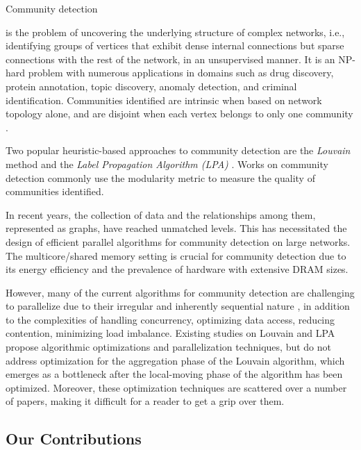 Community detection is the problem of uncovering the underlying structure of complex networks, i.e., identifying groups of vertices that exhibit dense internal connections but sparse connections with the rest of the network, in an unsupervised manner. It is an NP-hard problem with numerous applications in domains such as drug discovery, protein annotation, topic discovery, anomaly detection, and criminal identification. Communities identified are intrinsic when based on network topology alone, and are disjoint when each vertex belongs to only one community \cite{com-gregory10}. Two popular heuristic-based approaches to community detection are the \textit{Louvain} method \cite{com-blondel08} and the \textit{Label Propagation Algorithm (LPA)} \cite{com-raghavan07}. Works on community detection commonly use the modularity metric \cite{com-newman06} to measure the quality of communities identified.

In recent years, the collection of data and the relationships among them, represented as graphs, have reached unmatched levels. This has necessitated the design of efficient parallel algorithms for community detection on large networks. The multicore/shared memory setting is crucial for community detection due to its energy efficiency and the prevalence of hardware with extensive DRAM sizes. However, many of the current algorithms for community detection are challenging to parallelize due to their irregular and inherently sequential nature \cite{com-halappanavar17}, in addition to the complexities of handling concurrency, optimizing data access, reducing contention, minimizing load imbalance. Existing studies on Louvain and LPA propose algorithmic optimizations and parallelization techniques, but do not address optimization for the aggregation phase of the Louvain algorithm, which emerges as a bottleneck after the local-moving phase of the algorithm has been optimized. Moreover, these optimization techniques are scattered over a number of papers, making it difficult for a reader to get a grip over them.




\subsection{Our Contributions}

